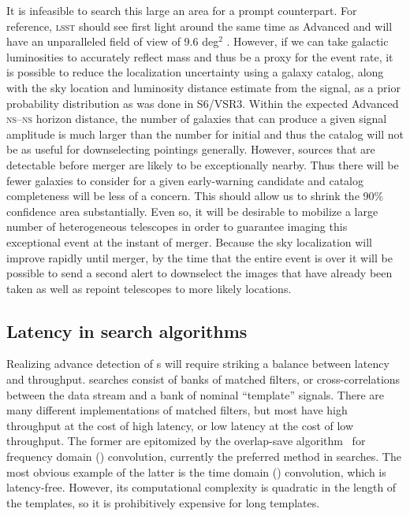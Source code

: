 It is infeasible to search this large an area for a prompt counterpart. For
reference, \textsc{lsst} should see first light around the same time as
Advanced \LIGO{} and will have an unparalleled field of view of 9.6 deg$^2$
\citep{2008arXiv0805.2366I}.  However, if we can take galactic luminosities
to accurately reflect mass and thus be a proxy for the \CBC{} event rate, it is
possible to reduce the localization uncertainty using a galaxy catalog, along
with the sky location and luminosity distance estimate from the \GW{} signal,
as a prior probability distribution \citep{galaxy-catalog} as was done in
S6/VSR3. Within the expected Advanced \LIGO{} \textsc{ns}--\textsc{ns} horizon
distance, the number of galaxies that can produce a given signal
amplitude is much larger than the number for initial \LIGO{} and thus the
catalog will not be as useful for downselecting pointings generally. However,
sources that are detectable before merger are likely to be exceptionally
nearby. Thus there will be fewer galaxies to consider for a given
early-warning candidate and catalog completeness will be less of a concern.
This should allow us to shrink the 90\% confidence area substantially.
Even so, it will be desirable to mobilize a large number of heterogeneous
telescopes in order to guarantee imaging this exceptional event at the instant
of merger. Because the sky localization will improve rapidly until merger,
by the time that the entire \CBC{} event is over it will be
possible to send a second alert to downselect the images that have already been
taken as well as repoint telescopes to more likely locations.

\subsection{Latency in \CBC{} search algorithms}

Realizing advance detection of \CBC{}s will
require striking a balance between latency and throughput. \CBC{} searches
consist of banks of matched filters, or
cross-correlations between the data stream and a bank of nominal ``template''
signals.  There are many different implementations of matched filters, but most
have high throughput at the cost of high latency, or low latency at the cost of
low throughput.  The former are epitomized by the overlap-save algorithm~%
\citep{numerical-recipes-chapter-13} for frequency domain (\FD) convolution,
currently the preferred method in \GW{}
searches.  The most obvious example of the latter is the time domain
(\TD) convolution, which is latency-free.  However, its
computational complexity is quadratic in the length of the templates, so it is
prohibitively expensive for long templates.

